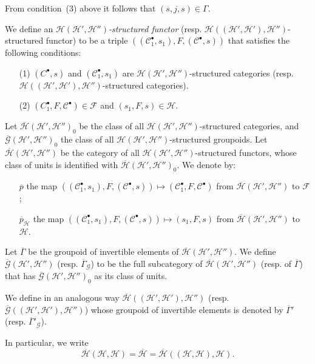 \documentclass[a4paper,fleqn]{article}
\theoremstyle{plain}
\theoremstyle{definition}
\newenvironment{definition}[1]
  {\renewcommand\theinnerdefinition{#1}\innerdefinition}
  {\endinnerdefinition}
\newcommand{\CC}{\mathcal{C}}
\newcommand{\HH}{\mathcal{H}}
\newcommand{\bHH}{\overline{\HH}}
\newcommand{\FF}{\mathcal{F}}
\newcommand{\GG}{\mathcal{G}}
\begin{document}
From condition~(3) above it follows that $(s,j,s)\in\Gamma$.

\begin{definition}{5}
\label{definition:ii-5}
  We define an \emph{$\HH(\HH',\HH'')$-structured functor} (resp. $\HH((\HH',\HH'),\HH'')$-structured functor) to be a triple $((\CC_1^\bullet,s_1),F,(\CC^\bullet,s))$ that satisfies the following conditions:
  \begin{enumerate}
    \item[\normalfont(1)]
      $(C^\bullet,s)$ and $(\CC_1^\bullet,s_1)$ are $\HH(\HH',\HH'')$-structured categories (resp. $\HH((\HH',\HH'),\HH'')$-structured categories).

    \item[\normalfont(2)]
      $(C_1^\bullet,F,\CC^\bullet)\in\FF$ and $(s_1,F,s)\in\HH$.
  \end{enumerate}
\end{definition}

Let $\bHH(\HH',\HH'')_0$ be the class of all $\HH(\HH',\HH'')$-structured categories, and $\overline{\GG}(\HH',\HH'')_0$ the class of all $\HH(\HH',\HH'')$-structured groupoids.
Let $\bHH(\HH',\HH'')$ be the category of all $\HH(\HH',\HH'')$-structured functors, whose class of units is identified with $\bHH(\HH',\HH'')_0$.
We denote by:
\begin{itemize}
  \item[]
    $\overline{p}$ the map $((\CC_1^\bullet,s_1),F,(\CC^\bullet,s))\mapsto(\CC_1^\bullet,F,\CC^\bullet)$ from $\bHH(\HH',\HH'')$ to $\FF$;

  \item[]
    $\overline{p}_\HH$ the map $((\CC_1^\bullet,s_1),F,(\CC^\bullet,s))\mapsto(s_1,F,s)$ from $\bHH(\HH',\HH'')$ to $\HH$.
\end{itemize}

Let $\overline{\Gamma}$ be the groupoid of invertible elements of $\bHH(\HH',\HH'')$.
We define $\overline{\GG}(\HH',\HH'')$ (resp. $\overline{\Gamma}_\GG$) to be the full subcategory of $\bHH(\HH',\HH'')$ (resp. of $\overline{\Gamma}$) that has $\overline{\GG}(\HH',\HH'')_0$ as its class of units.

We define in an analogous way $\bHH((\HH',\HH'),\HH'')$ (resp. $\overline{\GG}((\HH',\HH'),\HH'')$) whose groupoid of invertible elements is denoted by $\overline{\Gamma}'$ (resp. $\overline{\Gamma}'_\GG$).

In particular, we write
\[
  \bHH(\HH,\HH)
  = \bHH
  = \bHH((\HH,\HH),\HH).
\]
\end{document}
